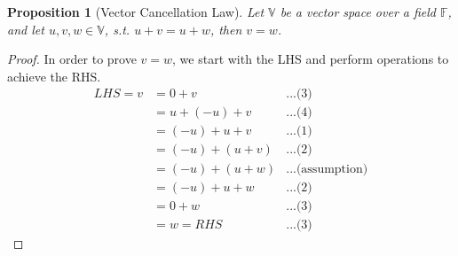 \documentclass{article}
\newtheorem{proposition}{Proposition}[section] %
\begin{document}
\begin{proposition}[Vector Cancellation Law]
   Let $\mathbb{V}$ be a vector space over a field $\mathbb{F}$, and let $u,v,w \in \mathbb{V}$, s.t. $u+v=u+w$, then $v=w$.
\end{proposition}
\begin{proof}
    In order to prove $v=w$, we start with the LHS and perform operations to achieve the RHS.
    \begin{align*}
        LHS = v &= 0 + v & \text{...(3)} \\
        &= u + (-u) + v & \text{...(4)} \\
        &= (-u) + u + v & \text{...(1)} \\
        &= (-u) + (u + v) & \text{...(2)} \\
        &= (-u) + (u + w) & \text{...(assumption)} \\
        &= (-u) + u + w & \text{...(2)} \\
        &= 0 + w & \text{...(3)} \\
        &= w = RHS & \text{...(3)}
    \end{align*}
\end{proof}







\end{document}
